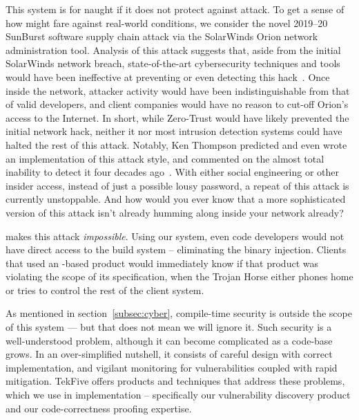 %
%
%

This system is for naught if it does not protect against attack.
To get a sense of how \projectName might fare against real-world conditions, we consider the novel 2019--20 SunBurst software supply chain attack via the SolarWinds Orion network administration tool.
Analysis of this attack suggests that, aside from the initial SolarWinds network breach, state-of-the-art cybersecurity techniques and tools would have been ineffective at preventing or even detecting this hack~\cite{gao2022cybersecurity, fireeye2020sunburst}.
Once inside the network, attacker activity would have been indistinguishable from that of valid developers, and client companies would have no reason to cut-off Orion's access to the Internet.
In short, while Zero-Trust would have likely prevented the initial network hack, neither it nor most intrusion detection systems could have halted the rest of this attack.
Notably, Ken Thompson predicted and even wrote an implementation of this attack style, and commented on the almost total inability to detect it four decades ago~\cite{thompson1984trust}.
With either social engineering or other insider access, instead of just a possible lousy password, a repeat of this attack is currently unstoppable.
And how would you ever know that a more sophisticated version of this attack isn't already humming along inside your network already?

\projectName makes this attack \emph{impossible}.
Using our system, even code developers would not have direct access to the build system -- eliminating the binary injection.
Clients that used an \projectName-based product would immediately know if that product was violating the scope of its specification, when the Trojan Horse either phones home or tries to control the rest of the client system.

As mentioned in section~\ref{subsec:cyber}, compile-time security is outside the scope of this system --- but that does not mean we will ignore it.
Such security is a well-understood problem, although it can become complicated as a code-base grows.
In an over-simplified nutshell, it consists of careful design with correct implementation, and vigilant monitoring for vulnerabilities coupled with rapid mitigation.
TekFive offers products and techniques that address these problems, which we use in implementation -- specifically our \analysisName vulnerability discovery product and our code-correctness proofing expertise.

